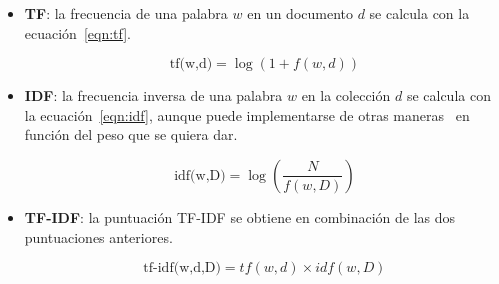 \begin{itemize}
	\item \textbf{TF}: la frecuencia de una palabra $w$ en un documento $d$ se calcula con la ecuación~\ref{eqn:tf}.
	
	\begin{equation}\label{eqn:tf} \textrm{tf(w,d)} = \log{(1 + f(w,d))} \end{equation}
	
	\item \textbf{IDF}: la frecuencia inversa de una palabra $w$ en la colección $d$ se calcula con la ecuación~\ref{eqn:idf}, aunque puede implementarse de otras maneras~\cite{tfidfsklearn2020} en función del peso que se quiera dar.
	
	\begin{equation}\label{eqn:idf} \textrm{idf(w,D)} = \log{(\frac{N}{f(w,D)})} \end{equation}
	
	\item \textbf{TF-IDF}: la puntuación TF-IDF se obtiene en combinación de las dos puntuaciones anteriores.
	
	\begin{equation}\label{eqn:tfidf} \textrm{tf-idf(w,d,D)} = tf(w,d) \times idf(w,D) \end{equation}
	
\end{itemize}





